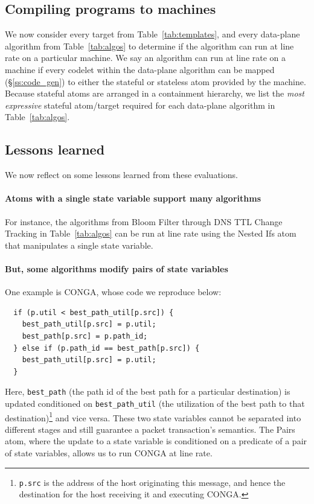 \subsection{Compiling \pktlanguage programs to \absmachine machines}
\label{ss:compiler}
We now consider every target from Table~\ref{tab:templates}, and every
data-plane algorithm from Table~\ref{tab:algos} to determine if the algorithm
can run at line rate on a particular \absmachine machine. We say an algorithm
can run at line rate on a \absmachine machine if every codelet within the
data-plane algorithm can be mapped (\S\ref{ss:code_gen}) to either the stateful
or stateless atom provided by the \absmachine machine. Because stateful atoms
are arranged in a containment hierarchy, we list the \textit{most expressive}
stateful atom/target required for each data-plane algorithm in
Table~\ref{tab:algos}.

\subsection{Lessons learned}
\label{ss:lessons}
We now reflect on some lessons learned from these evaluations.

\paragraph{Atoms with a single state variable support many algorithms}

For instance, the algorithms from Bloom Filter through DNS TTL Change Tracking
in Table~\ref{tab:algos} can be run at line rate using the Nested Ifs atom that
manipulates a single state variable.

\paragraph{But, some algorithms modify pairs of state variables}

One example is CONGA, whose code we reproduce below:
\begin{verbatim}
  if (p.util < best_path_util[p.src]) {
    best_path_util[p.src] = p.util;
    best_path[p.src] = p.path_id;
  } else if (p.path_id == best_path[p.src]) {
    best_path_util[p.src] = p.util;
  }
\end{verbatim}
Here, \texttt{best\_path} (the path id of the best path for a particular
destination) is updated conditioned on \texttt{best\_path\_util} (the
utilization of the best path to that destination)\footnote{{\tt p.src} is the
  address of the host originating this message, and hence the destination for
the host receiving it and executing CONGA.} and vice versa. These two state
variables cannot be separated into different stages and still guarantee a
packet transaction's semantics. The Pairs atom, where the update to a state
variable is conditioned on a predicate of a pair of state variables, allows us
to run CONGA at line rate.

